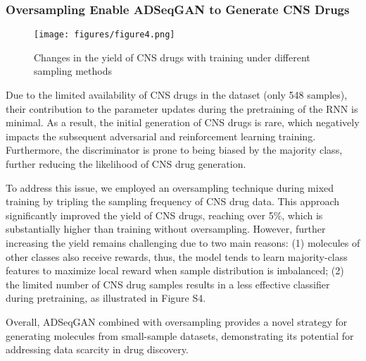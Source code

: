\documentclass[10pt, twocolumn]{article}
\begin{document}
\subsubsection*{Oversampling Enable ADSeqGAN to Generate CNS Drugs}

\begin{figure}[h] %
    \centering
    \texttt{[image: figures/figure4.png]}
    \caption{\small Changes in the yield of CNS drugs with training under different sampling methods}
    \label{fig:fig4}
\end{figure}

Due to the limited availability of CNS drugs in the dataset (only 548 samples), their contribution to the parameter updates during the pretraining of the RNN is minimal. As a result, the initial generation of CNS drugs is rare, which negatively impacts the subsequent adversarial and reinforcement learning training. Furthermore, the discriminator is prone to being biased by the majority class, further reducing the likelihood of CNS drug generation.

To address this issue, we employed an oversampling technique during mixed training by tripling the sampling frequency of CNS drug data. This approach significantly improved the yield of CNS drugs, reaching over 5\%, which is substantially higher than training without oversampling. However, further increasing the yield remains challenging due to two main reasons: (1) molecules of other classes also receive rewards, thus, the model tends to learn majority-class features to maximize local reward when sample distribution is imbalanced; (2) the limited number of CNS drug samples results in a less effective classifier during pretraining, as illustrated in Figure S4.

Overall, ADSeqGAN combined with oversampling provides a novel strategy for generating molecules from small-sample datasets, demonstrating its potential for addressing data scarcity in drug discovery.

\end{document}
